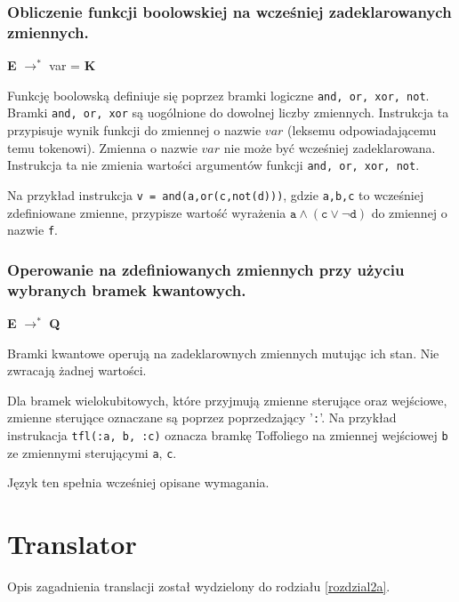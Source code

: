 \subsubsection{Obliczenie funkcji boolowskiej na wcześniej zadeklarowanych zmiennych.}
\begin{center}
    \textbf{E} $\rightarrow^*$ var = \textbf{K}
\end{center}
Funkcję boolowską definiuje się poprzez bramki logiczne \texttt{and, or, xor, not}. Bramki \texttt{and, or, xor} są uogólnione do dowolnej liczby zmiennych. Instrukcja ta przypisuje wynik funkcji do zmiennej o nazwie $var$ (leksemu odpowiadającemu temu tokenowi). Zmienna o nazwie $var$ nie może być wcześniej zadeklarowana. Instrukcja ta nie zmienia wartości argumentów funkcji \texttt{and, or, xor, not}. 
\par Na przykład instrukcja \texttt{v = and(a,or(c,not(d)))}, gdzie \texttt{a,b,c} to wcześniej zdefiniowane zmienne, przypisze wartość wyrażenia $\texttt{a} \land (\texttt{c} \lor \neg \texttt{d})$ do zmiennej o nazwie \texttt{f}.
\subsubsection{Operowanie na zdefiniowanych zmiennych przy użyciu wybranych bramek kwantowych.}
\begin{center}
    \textbf{E} $\rightarrow^*$ \textbf{Q}
\end{center}
Bramki kwantowe operują na zadeklarownych zmiennych mutując ich stan. Nie zwracają żadnej wartości.
\par Dla bramek wielokubitowych, które przyjmują zmienne sterujące oraz wejściowe, zmienne sterujące oznaczane są poprzez poprzedzający '\texttt{:}'. Na przykład instrukacja \texttt{tfl(:a, b, :c)} oznacza bramkę Toffoliego na zmiennej wejściowej \texttt{b} ze zmiennymi sterującymi \texttt{a}, \texttt{c}.\\
\par Język ten spełnia wcześniej opisane wymagania.
\section{Translator}
Opis zagadnienia translacji został wydzielony do rodziału \ref{rozdzial2a}.
